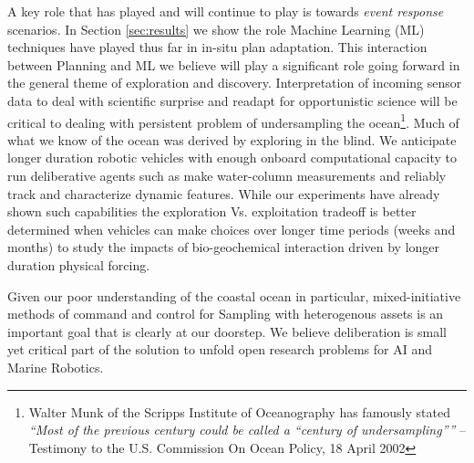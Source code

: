 A key role that \rx has played and will continue to play is towards
\emph{event response} scenarios. In Section \ref{sec:results} we show
the role Machine Learning (ML) techniques have played thus far in
in-situ plan adaptation. This interaction between Planning and ML we
believe will play a significant role going forward in the general
theme of exploration and discovery. Interpretation of incoming sensor
data to deal with scientific surprise and readapt for opportunistic
science will be critical to dealing with persistent problem of
undersampling the ocean\footnote{Walter Munk of the Scripps Institute
  of Oceanography has famously stated \emph{``Most of the previous
    century could be called a “century of undersampling”''} --
  Testimony to the U.S. Commission On Ocean Policy, 18 April
  2002}. Much of what we know of the ocean was derived by exploring in
the blind. We anticipate longer duration robotic vehicles with enough
onboard computational capacity to run deliberative agents such as \rx
make water-column measurements and reliably track and characterize
dynamic features. While our experiments have already shown such
capabilities the exploration Vs. exploitation tradeoff is better
determined when vehicles can make choices over longer time periods
(weeks and months) to study the impacts of bio-geochemical interaction
driven by longer duration physical forcing.

Given our poor understanding of the coastal ocean in particular,
mixed-initiative methods of command and control for Sampling with
heterogenous assets is an important goal that is clearly at our
doorstep. We believe deliberation is small yet critical part of the
solution to unfold open research problems for AI and Marine Robotics.
